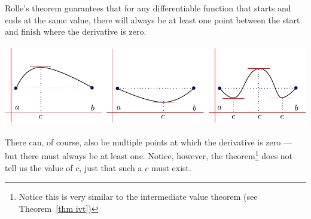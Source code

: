 Rolle's theorem guarantees that for any differentiable function that starts and ends at
the same value, there will always be at least one point between the start and finish
where the derivative is zero.
\begin{fig}
\begin{center}
 \includegraphics[height=3.5cm]{extra/rolle}
\end{center}
\end{fig}
There can, of course, also be multiple points at which the derivative is zero --- but
there must always be at least one. Notice, however, the theorem\footnote{Notice this is
very similar to the intermediate value theorem (see Theorem~\ref{thm ivt})}
does not tell us the value of $c$, just that such a $c$ must exist.

